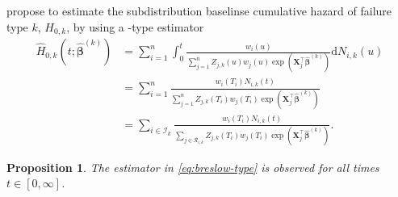 \documentclass[11pt]{article}
\newcommand{\X}{\mathbf{X}}
\renewcommand{\b}{\bm{\beta}}
\renewcommand{\d}{\text{d}}
\newtheorem{proposition}[theorem]{Proposition}
\begin{document}
\cite{fine1999proportional} propose to estimate the subdistribution baselinse cumulative hazard of failure type $k$, $H_{0,k}$, by using a \cite{breslow1975}-type estimator 
\begin{equation} \label{eq:breslow-type}
\begin{split}
	\widehat{H}_{0,k}\left(t ; \widehat{\b}^{(k)}\right)
	&=
	\sum_{i=1}^n \int_0^t \frac{ w_i(u) }{ \sum_{j=1}^n Z_{j,k}(u) w_j(u) \exp( \X_j^\top \widehat{\b}^{(k)} )  } \d N_{i,k}(u)
	\\ &=
	\sum_{i=1}^n \frac{ w_i(T_i)N_{i,k}(t) }{ \sum_{j=1}^n Z_{j,k}(T_i) w_j(T_i) \exp(\X_j^\top \widehat{\b}^{(k)}) }
	\\ &=
	\sum_{i \in \mathcal{I}_k } \frac{ w_i(T_i)N_{i,k}(t) }{ \sum_{j \in \mathcal{R}_{i,k} } Z_{j,k}(T_i) w_j(T_i) \exp(\X_j^\top \widehat{\b}^{(k)}) }.
\end{split}
\end{equation}
\begin{proposition}
	The estimator in \eqref{eq:breslow-type} is observed for all times $t \in [0,\infty]$.
\end{proposition}
\end{document}
